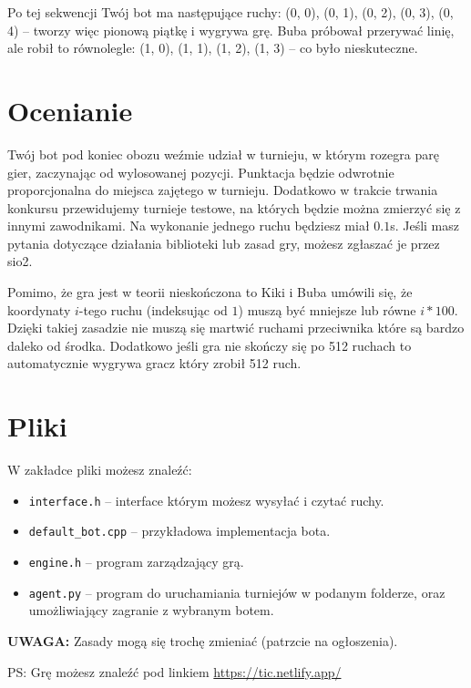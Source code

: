 \documentclass{spiral}
\begin{document}
\bigskip

\noindent
\noindent Po tej sekwencji Twój bot ma następujące ruchy: (0, 0), (0, 1), (0,
2), (0, 3), (0, 4) – tworzy więc pionową piątkę i wygrywa grę. Buba próbował
przerywać linię, ale robił to równolegle: (1, 0), (1, 1), (1, 2),
(1, 3) – co było nieskuteczne.


\section{Ocenianie}
\noindent Twój bot pod koniec obozu weźmie udział w turnieju, w którym rozegra
parę gier, zaczynając od wylosowanej pozycji. Punktacja będzie odwrotnie
proporcjonalna do miejsca zajętego w turnieju. Dodatkowo w trakcie trwania
konkursu przewidujemy turnieje testowe, na których będzie można zmierzyć się z
innymi zawodnikami. Na wykonanie jednego ruchu będziesz miał $0.1$s. Jeśli
masz pytania dotyczące działania biblioteki lub zasad gry, możesz zgłaszać je
przez sio2.

\noindent Pomimo, że gra jest w teorii nieskończona to Kiki i Buba umówili się,
że koordynaty $i$-tego ruchu (indeksując od $1$) muszą być mniejsze lub równe
$i * 100$. Dzięki takiej zasadzie nie muszą się martwić ruchami przeciwnika
które są bardzo daleko od środka.
\noindent Dodatkowo jeśli gra nie skończy się po 512 ruchach to automatycznie
wygrywa gracz który zrobił 512 ruch.

\section{Pliki}
\noindent
W zakładce pliki możesz znaleźć:
\begin{itemize}
	\item \texttt{interface.h} – interface którym możesz wysyłać i czytać
	      ruchy.
	\item \texttt{default\_bot.cpp} – przykładowa implementacja bota.
	\item \texttt{engine.h} – program zarządzający grą.
	\item \texttt{agent.py} – program do uruchamiania turniejów w podanym
	      folderze, oraz umożliwiający zagranie z wybranym botem.

\end{itemize}
\textbf{UWAGA:} Zasady mogą się trochę zmieniać (patrzcie na ogłoszenia).


\vfill
\noindent PS: Grę możesz znaleźć pod linkiem
\href{https://tic.netlify.app/}{https://tic.netlify.app/}
\end{document}
